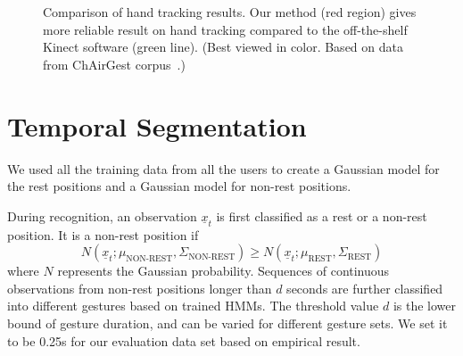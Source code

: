 \documentclass{sig-alternate-2013}
\begin{document}
\begin{figure}
\centering
{}
\caption{Comparison of hand tracking results. Our method (red region) gives more
reliable result on hand tracking compared to the off-the-shelf Kinect software
(green line). (Best viewed in color. Based on data from ChAirGest
corpus~\cite{Ruffieux2013}.)}
\label{fig:compare-skeleton}
\end{figure}

\vfill

\section{Temporal Segmentation}\label{sec:recognition}
We used all the training data from all the users to create a Gaussian model for the rest 
positions and a Gaussian model for non-rest positions.

During recognition, an observation $\underline{x}_t$ is first classified as a 
rest or a non-rest position. It is a non-rest position if 
\begin{displaymath}
N(\underline{x}_t; \mu_{\text{NON-REST}}, \Sigma_{\text{NON-REST}}) \geq N(\underline{x}_t; \mu_{\text{REST}}, \Sigma_{\text{REST}})
\end{displaymath}
where $N$ represents the Gaussian probability. Sequences of continuous observations from non-rest
positions longer than $d$ seconds are further classified into different
gestures based on trained HMMs. The threshold value $d$ is the lower bound of
gesture duration, and can be varied for different gesture sets. We set it to
be 0.25s for our evaluation data set based on empirical result.
 
\end{document}
